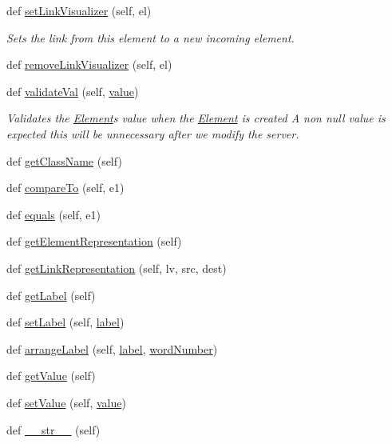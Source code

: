 \begin{DoxyCompactItemize}
def \hyperlink{class_element_1_1_element_a6aac3e4778ae009406417439c778f904}{set\+Link\+Visualizer} (self, el)
\begin{DoxyCompactList}\small\item\em Sets the link from this element to a new incoming element. \end{DoxyCompactList}\item 
def \hyperlink{class_element_1_1_element_a2dde72f6339b9d052df50bb4a5de2502}{remove\+Link\+Visualizer} (self, el)
\item 
def \hyperlink{class_element_1_1_element_ae864741d8f6e980b2ecb4bed62e87e96}{validate\+Val} (self, \hyperlink{class_element_1_1_element_ae9c30f7574a4356686d93e4567cf61f8}{value})
\begin{DoxyCompactList}\small\item\em Validates the \hyperlink{class_element_1_1_element}{Element}\textquotesingle{}s value when the \hyperlink{class_element_1_1_element}{Element} is created A non null value is expected this will be unnecessary after we modify the server. \end{DoxyCompactList}\item 
def \hyperlink{class_element_1_1_element_a5e7edd71cdc182f6449cdb47fb6d396b}{get\+Class\+Name} (self)
\item 
def \hyperlink{class_element_1_1_element_acc377fb2d5856281eb9804b2a3275edc}{compare\+To} (self, e1)
\item 
def \hyperlink{class_element_1_1_element_adf032a6f79735b75e3f1071cc708f626}{equals} (self, e1)
\item 
def \hyperlink{class_element_1_1_element_a5fa599166de5a0053b235d012fbfc42c}{get\+Element\+Representation} (self)
\item 
def \hyperlink{class_element_1_1_element_a87e09915bdcd4d07efb293d54ca5b270}{get\+Link\+Representation} (self, lv, src, dest)
\item 
def \hyperlink{class_element_1_1_element_a52a3e2777d110a86950a6e88dfcdd0a4}{get\+Label} (self)
\item 
def \hyperlink{class_element_1_1_element_a21af17ef037212f8ab693ec66952e4ac}{set\+Label} (self, \hyperlink{class_element_1_1_element_a1eaadb79747dd83097612cac742976fa}{label})
\item 
def \hyperlink{class_element_1_1_element_ab68f114977f0cc57c9499444d2bc8799}{arrange\+Label} (self, \hyperlink{class_element_1_1_element_a1eaadb79747dd83097612cac742976fa}{label}, \hyperlink{class_element_1_1_element_a58cc88e7f79da391e25e4fa98845b8cc}{word\+Number})
\item 
def \hyperlink{class_element_1_1_element_a55c19f29f1c643e13e11441c4f3491e0}{get\+Value} (self)
\item 
def \hyperlink{class_element_1_1_element_a267a7f5770e823ca3b6e5bc88fa6dfa9}{set\+Value} (self, \hyperlink{class_element_1_1_element_ae9c30f7574a4356686d93e4567cf61f8}{value})
\item 
def \hyperlink{class_element_1_1_element_a2ffb262087576d15a2e93b864d4ce13a}{\+\_\+\+\_\+str\+\_\+\+\_\+} (self)
\end{DoxyCompactItemize}
